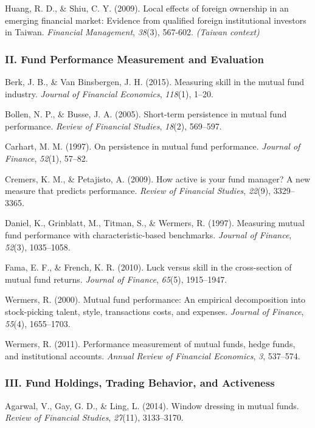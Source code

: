 \documentclass[
  12pt,
  letterpaper,
  DIV=11,
  numbers=noendperiod]{scrartcl}
\begin{document}
Huang, R. D., \& Shiu, C. Y. (2009). Local effects of foreign ownership
in an emerging financial market: Evidence from qualified foreign
institutional investors in Taiwan. \emph{Financial Management},
\emph{38}(3), 567-602. \emph{(Taiwan context)}

\subsubsection{II. Fund Performance Measurement and
Evaluation}\label{ii.-fund-performance-measurement-and-evaluation}

Berk, J. B., \& Van Binsbergen, J. H. (2015). Measuring skill in the
mutual fund industry. \emph{Journal of Financial Economics},
\emph{118}(1), 1--20.

Bollen, N. P., \& Busse, J. A. (2005). Short-term persistence in mutual
fund performance. \emph{Review of Financial Studies}, \emph{18}(2),
569--597.

Carhart, M. M. (1997). On persistence in mutual fund performance.
\emph{Journal of Finance}, \emph{52}(1), 57--82.

Cremers, K. M., \& Petajisto, A. (2009). How active is your fund
manager? A new measure that predicts performance. \emph{Review of
Financial Studies}, \emph{22}(9), 3329--3365.

Daniel, K., Grinblatt, M., Titman, S., \& Wermers, R. (1997). Measuring
mutual fund performance with characteristic-based benchmarks.
\emph{Journal of Finance}, \emph{52}(3), 1035--1058.

Fama, E. F., \& French, K. R. (2010). Luck versus skill in the
cross-section of mutual fund returns. \emph{Journal of Finance},
\emph{65}(5), 1915--1947.

Wermers, R. (2000). Mutual fund performance: An empirical decomposition
into stock-picking talent, style, transactions costs, and expenses.
\emph{Journal of Finance}, \emph{55}(4), 1655--1703.

Wermers, R. (2011). Performance measurement of mutual funds, hedge
funds, and institutional accounts. \emph{Annual Review of Financial
Economics}, \emph{3}, 537--574.

\subsubsection{III. Fund Holdings, Trading Behavior, and
Activeness}\label{iii.-fund-holdings-trading-behavior-and-activeness}

Agarwal, V., Gay, G. D., \& Ling, L. (2014). Window dressing in mutual
funds. \emph{Review of Financial Studies}, \emph{27}(11), 3133--3170.
\end{document}
